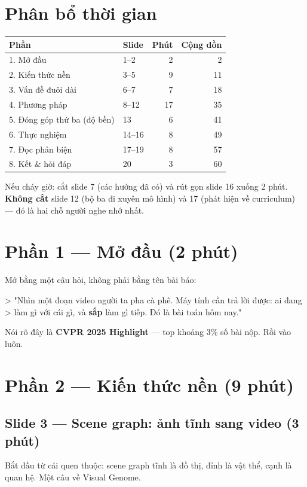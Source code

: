 \documentclass[11pt,a4paper]{article}
\begin{document}
\section{Phân bổ thời gian}
\begin{center}\small
\begin{tabular}{@{}llrr@{}}
\toprule
\textbf{Phần} & \textbf{Slide} & \textbf{Phút} & \textbf{Cộng dồn}\\
\midrule
1. Mở đầu & 1--2 & 2 & 2\\
2. Kiến thức nền & 3--5 & 9 & 11\\
3. Vấn đề đuôi dài & 6--7 & 7 & 18\\
4. Phương pháp & 8--12 & 17 & 35\\
5. Đóng góp thứ ba (độ bền) & 13 & 6 & 41\\
6. Thực nghiệm & 14--16 & 8 & 49\\
7. Đọc phản biện & 17--19 & 8 & 57\\
8. Kết \& hỏi đáp & 20 & 3 & 60\\
\bottomrule
\end{tabular}
\end{center}
Nếu cháy giờ: cắt slide 7 (các hướng đã có) và rút gọn slide 16 xuống 2 phút. \textbf{Không cắt} slide 12 (bộ ba đi xuyên mô hình) và 17 (phát hiện về curriculum) --- đó là hai chỗ người nghe nhớ nhất.

\section{Phần 1 --- Mở đầu (2 phút)}
Mở bằng một câu hỏi, không phải bằng tên bài báo:

> "Nhìn một đoạn video người ta pha cà phê. Máy tính cần trả lời được: ai đang > làm gì với cái gì, và \textbf{sắp} làm gì tiếp. Đó là bài toán hôm nay."

Nói rõ đây là \textbf{CVPR 2025 Highlight} --- top khoảng 3\% số bài nộp. Rồi vào luôn.

\section{Phần 2 --- Kiến thức nền (9 phút)}
\subsection{Slide 3 --- Scene graph: ảnh tĩnh sang video (3 phút)}
Bắt đầu từ cái quen thuộc: scene graph tĩnh là đồ thị, đỉnh là vật thể, cạnh là quan hệ. Một câu về Visual Genome.
\end{document}
